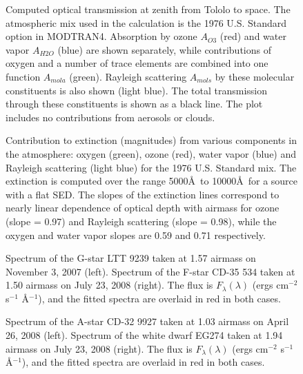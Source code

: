 \documentclass[manuscript]{aastex}
\begin{document}
\clearpage

\begin{figure}
\caption{Computed optical transmission at zenith from Tololo to space.
   The atmospheric mix used in the calculation is the 1976 U.S. Standard option in MODTRAN4.
   Absorption by ozone $A_{O3}$ (red) and water vapor $A_{H2O}$ (blue) are shown separately, while contributions of
   oxygen and a number of trace elements are combined into one function $A_{mola}$ (green).
   Rayleigh scattering $A_{mols}$ by these molecular constituents is also shown (light blue).
   The total transmission through these constituents is shown as a black line.  
   The plot includes no contributions from aerosols or clouds.
          \label{fig:templates}}
\end{figure}

\begin{figure}
\caption{Contribution to extinction (magnitudes) from various components in the atmosphere:
   oxygen (green), ozone (red), water vapor (blue) and Rayleigh scattering (light blue) for the 1976 U.S. Standard mix.
   The extinction is computed over the range 5000\AA~to 10000\AA~for a source with a flat SED.
   The slopes of the extinction lines correspond to nearly linear dependence of optical depth with airmass for ozone (slope = 0.97) and Rayleigh scattering (slope = 0.98),
   while the oxygen and water vapor slopes are 0.59 and 0.71 respectively. 
          \label{fig:Evsz}}
\end{figure}

\begin{figure}
\caption{Spectrum of the G-star LTT 9239 taken at 1.57 airmass on November 3, 2007 (left).
   Spectrum of the F-star CD-35 534 taken at 1.50 airmass on July 23, 2008 (right).
   The flux is $F_{\lambda}(\lambda)$ (ergs cm$^{-2}$ s$^{-1}$ \AA$^{-1}$), and the fitted spectra are overlaid in red in both cases.
         \label{fig:spectra}}
\end{figure}

\begin{figure}
\caption{Spectrum of the A-star CD-32 9927 taken at 1.03 airmass on April 26, 2008 (left).
   Spectrum of the white dwarf EG274 taken at 1.94 airmass on July 23, 2008 (right).
   The flux is $F_{\lambda}(\lambda)$ (ergs cm$^{-2}$ s$^{-1}$ \AA$^{-1}$), and the fitted spectra are overlaid in red in both cases.  
\label{fig:morespectra}}
\end{figure} 
\end{document}
